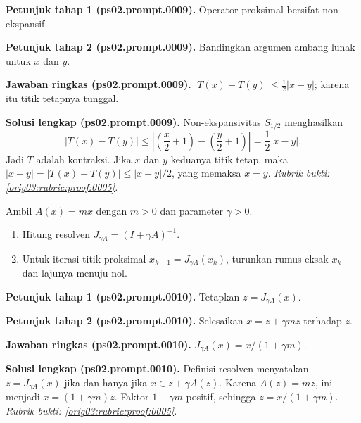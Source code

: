\par\noindent\textbf{Petunjuk tahap 1 (ps02.prompt.0009).}
Operator proksimal bersifat non-ekspansif.
\label{orig03:ps02:hint1:0009}
\par\noindent\textbf{Petunjuk tahap 2 (ps02.prompt.0009).}
Bandingkan argumen ambang lunak untuk $x$ dan $y$.
\label{orig03:ps02:hint2:0009}
\par\noindent\textbf{Jawaban ringkas (ps02.prompt.0009).}
$|T(x)-T(y)|\leq\tfrac12|x-y|$; karena itu titik tetapnya tunggal.
\label{orig03:ps02:answer:0009}
\par\noindent\textbf{Solusi lengkap (ps02.prompt.0009).}
Non-ekspansivitas $S_{1/2}$ menghasilkan
\[
 |T(x)-T(y)|
 \leq\left|\left(\frac x2+1\right)-
              \left(\frac y2+1\right)\right|
 =\frac12|x-y|.
\]
Jadi $T$ adalah kontraksi. Jika $x$ dan $y$ keduanya titik tetap, maka
$|x-y|=|T(x)-T(y)|\leq|x-y|/2$, yang memaksa $x=y$.
\emph{Rubrik bukti: \ref{orig03:rubric:proof:0005}.}
\label{orig03:ps02:solution:0009}

\begin{exercise}
\label{orig03:ps02:problem:0005}
Ambil $A(x)=mx$ dengan $m>0$ dan parameter $\gamma>0$.
\begin{enumerate}
\item\label{orig03:ps02:prompt:0010}
Hitung resolven $J_{\gamma A}=(I+\gamma A)^{-1}$.
\item\label{orig03:ps02:prompt:0011}
Untuk iterasi titik proksimal $x_{k+1}=J_{\gamma A}(x_k)$, turunkan rumus
eksak $x_k$ dan lajunya menuju nol.
\end{enumerate}
\end{exercise}

\par\noindent\textbf{Petunjuk tahap 1 (ps02.prompt.0010).}
Tetapkan $z=J_{\gamma A}(x)$.
\label{orig03:ps02:hint1:0010}
\par\noindent\textbf{Petunjuk tahap 2 (ps02.prompt.0010).}
Selesaikan $x=z+\gamma mz$ terhadap $z$.
\label{orig03:ps02:hint2:0010}
\par\noindent\textbf{Jawaban ringkas (ps02.prompt.0010).}
$J_{\gamma A}(x)=x/(1+\gamma m)$.
\label{orig03:ps02:answer:0010}
\par\noindent\textbf{Solusi lengkap (ps02.prompt.0010).}
Definisi resolven menyatakan
$z=J_{\gamma A}(x)$ jika dan hanya jika
$x\in z+\gamma A(z)$. Karena $A(z)=mz$, ini menjadi
$x=(1+\gamma m)z$. Faktor $1+\gamma m$ positif, sehingga
$z=x/(1+\gamma m)$.
\emph{Rubrik bukti: \ref{orig03:rubric:proof:0005}.}
\label{orig03:ps02:solution:0010}

